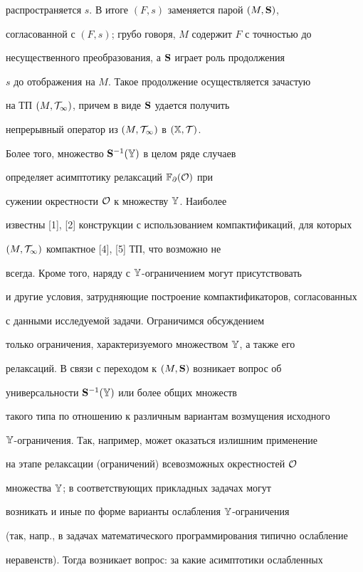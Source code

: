 распространяется $s$. В итоге $(F,s)$ заменяется парой $(M,\bold S)$,


согласованной с $(F,s)$; грубо говоря, $M$ содержит $F$ с точностью до


несущественного преобразования, а $\bold S$ играет роль продолжения


$s$ до отображения на $M$. Такое продолжение осуществляется зачастую


на ТП $(M,\cal T_1)$, причем в виде $\bold S$ удается получить


непрерывный оператор из $(M,\cal T_1)$ в $(\Bbb X,\cal T)$.


Более того, множество $\bold S^{-1}(\Bbb Y)$ в целом ряде случаев


определяет асимптотику релаксаций $\Bbb F_\partial(\cal O)$ при


сужении окрестности $\cal O$ к множеству $\Bbb Y$. Наиболее


известны [1], [2] конструкции с использованием компактификаций, для которых


$(M,\cal T_1)$ компактное [4], [5] ТП, что возможно не


всегда. Кроме того, наряду с $\Bbb Y$-ограничением могут присутствовать


и другие условия, затрудняющие построение компактификаторов, согласованных


с данными исследуемой задачи. Ограничимся обсуждением


только ограничения, характеризуемого множеством ${\Bbb Y}$, а также его


релаксаций. В связи с переходом к $(M,\bold S)$ возникает вопрос об


универсальности $\bold S^{-1}(\Bbb Y)$ или более общих множеств


такого типа по отношению к различным вариантам возмущения исходного


$\Bbb Y$-ограничения. Так, например, может оказаться излишним применение


на этапе релаксации (ограничений) всевозможных окрестностей $\cal O$


множества $\Bbb Y$; в соответствующих прикладных задачах могут


возникать и иные по форме варианты ослабления $\Bbb Y$-ограничения


(так, напр., в задачах математического программирования типично ослабление


неравенств). Тогда возникает вопрос: за какие асимптотики ослабленных


